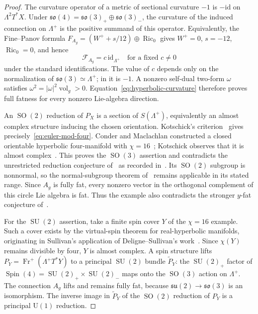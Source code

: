 \documentclass[11pt]{amsart}
\newcommand{\Fr}{\operatorname{Fr}}
\newcommand{\SO}{\operatorname{SO}}
\newcommand{\SU}{\operatorname{SU}}
\newcommand{\vol}{\operatorname{vol}}
\theoremstyle{plain}
\theoremstyle{definition}
\theoremstyle{remark}
\begin{document}
\begin{proof}
The curvature operator of a metric of sectional curvature $-1$ is
$-\mathrm{id}$ on $\Lambda^2T^*X$.  Under
$\mathfrak{so}(4)=\mathfrak{so}(3)_+\oplus\mathfrak{so}(3)_-$, the
curvature of the induced connection on $\Lambda^+$ is the positive
summand of this operator.  Equivalently, the Fine--Panov formula
$F_{A_g}=(W^++s/12)\oplus\operatorname{Ric}_0$ gives
$W^+=0$, $s=-12$, $\operatorname{Ric}_0=0$, and hence
\begin{equation}\label{eq:hyperbolic-curvature}
 \mathscr F_{A_g}=c\,\mathrm{id}_{\Lambda^+}
 \quad\text{for a fixed }c\ne0
\end{equation}
under the standard identifications.  The value of $c$ depends only on
the normalization of $\mathfrak{so}(3)\simeq\Lambda^+$; in
\cite[Section~3.1]{FP} it is $-1$.  A nonzero self-dual two-form
$\omega$ satisfies $\omega^2=|\omega|^2\vol_g>0$.
Equation~\eqref{eq:hyperbolic-curvature} therefore proves full
fatness for every nonzero Lie-algebra direction.

An $\SO(2)$ reduction of $P_X$ is a section of $S(\Lambda^+)$,
equivalently an almost complex structure inducing the chosen
orientation.  Kotschick's criterion~\cite[Proposition~11]{Kotschick}
gives precisely~\eqref{eq:euler-mod-four}.  Conder and Maclachlan
constructed a closed orientable hyperbolic four-manifold with
$\chi=16$~\cite{ConderMaclachlan}; Kotschick observes that it is
almost complex~\cite[Example~15]{Kotschick}.  This proves the
$\SO(3)$ assertion and contradicts the unrestricted reduction
conjecture of~\cite{ZillerFatness} as recorded in~\cite[Section~5]{FZ}.  Its $\SO(2)$ subgroup
is nonnormal, so the normal-subgroup theorem of~\cite{FZ} remains
applicable in its stated range.  Since $A_g$ is fully fat, every
nonzero vector in the orthogonal complement of this circle Lie
algebra is fat.  Thus the example also contradicts the stronger
$y$-fat conjecture of~\cite[Section~5]{FZ}.

For the $\SU(2)$ assertion, take a finite spin cover $Y$ of the
$\chi=16$ example.  Such a cover exists by the virtual-spin theorem
for real-hyperbolic manifolds, originating in Sullivan's application
of Deligne--Sullivan's work~\cite{DeligneSullivan,Sullivan,LongReid}.
Since $\chi(Y)$ remains divisible by four, $Y$ is almost complex.
A spin structure lifts $P_Y=\Fr^+(\Lambda^+T^*Y)$ to a principal
$\SU(2)$ bundle $\widetilde P_Y$: the $\SU(2)_+$ factor of
$\operatorname{Spin}(4)=\SU(2)_+\times\SU(2)_-$ maps onto the
$\SO(3)$ action on $\Lambda^+$.  The connection $A_g$ lifts and remains fully fat,
because $\mathfrak{su}(2)\to\mathfrak{so}(3)$ is an isomorphism.
The inverse image in $\widetilde P_Y$ of the $\SO(2)$ reduction of
$P_Y$ is a principal $\mathrm U(1)$ reduction.
\end{proof}
\end{document}
